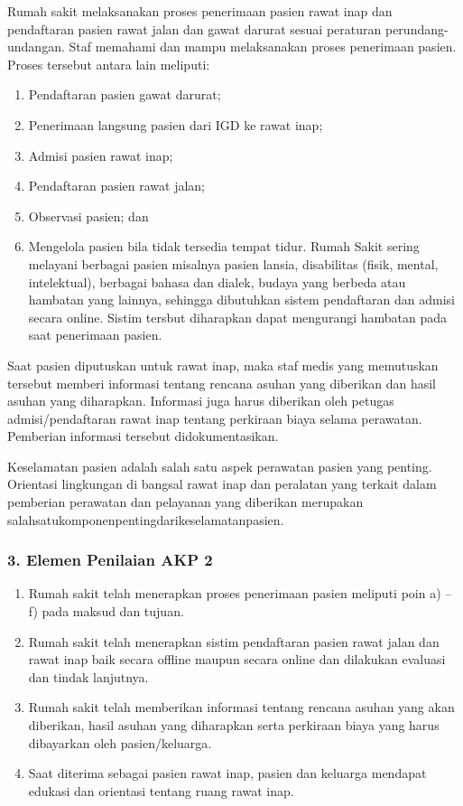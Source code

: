 \documentclass[
]{book}
\providecommand{\tightlist}{%
  \setlength{\itemsep}{0pt}\setlength{\parskip}{0pt}}
\begin{document}
Rumah sakit melaksanakan proses penerimaan pasien rawat inap dan pendaftaran pasien rawat jalan dan gawat darurat sesuai peraturan perundang-undangan. Staf memahami dan mampu melaksanakan proses penerimaan pasien. Proses tersebut antara lain meliputi:

\begin{enumerate}
\def\labelenumi{\alph{enumi}.}
\tightlist
\item
  Pendaftaran pasien gawat darurat;
\item
  Penerimaan langsung pasien dari IGD ke rawat inap;
\item
  Admisi pasien rawat inap;
\item
  Pendaftaran pasien rawat jalan;
\item
  Observasi pasien; dan
\item
  Mengelola pasien bila tidak tersedia tempat tidur. Rumah Sakit sering melayani berbagai pasien misalnya pasien lansia, disabilitas (fisik, mental, intelektual), berbagai bahasa dan dialek, budaya yang berbeda atau hambatan yang lainnya, sehingga dibutuhkan sistem pendaftaran dan admisi secara online. Sistim tersbut diharapkan dapat mengurangi hambatan pada saat penerimaan pasien.
\end{enumerate}

Saat pasien diputuskan untuk rawat inap, maka staf medis yang memutuskan tersebut memberi informasi tentang rencana asuhan yang diberikan dan hasil asuhan yang diharapkan. Informasi juga harus diberikan oleh petugas admisi/pendaftaran rawat inap tentang perkiraan biaya selama perawatan. Pemberian informasi tersebut didokumentasikan.

Keselamatan pasien adalah salah satu aspek perawatan pasien yang penting. Orientasi lingkungan di bangsal rawat inap dan peralatan yang terkait dalam pemberian perawatan dan pelayanan yang diberikan merupakan salahsatukomponenpentingdarikeselamatanpasien.

\hypertarget{elemen-penilaian-akp-2}{%
\subsubsection*{3. Elemen Penilaian AKP 2}\label{elemen-penilaian-akp-2}}

\begin{enumerate}
\def\labelenumi{\alph{enumi}.}
\tightlist
\item
  Rumah sakit telah menerapkan proses penerimaan pasien meliputi poin a) -- f) pada maksud dan tujuan.
\item
  Rumah sakit telah menerapkan sistim pendaftaran pasien rawat jalan dan rawat inap baik secara offline maupun secara online dan dilakukan evaluasi dan tindak lanjutnya.
\item
  Rumah sakit telah memberikan informasi tentang rencana asuhan yang akan diberikan, hasil asuhan yang diharapkan serta perkiraan biaya yang harus dibayarkan oleh pasien/keluarga.
\item
  Saat diterima sebagai pasien rawat inap, pasien dan keluarga mendapat edukasi dan orientasi tentang ruang rawat inap.
\end{enumerate}
\end{document}
